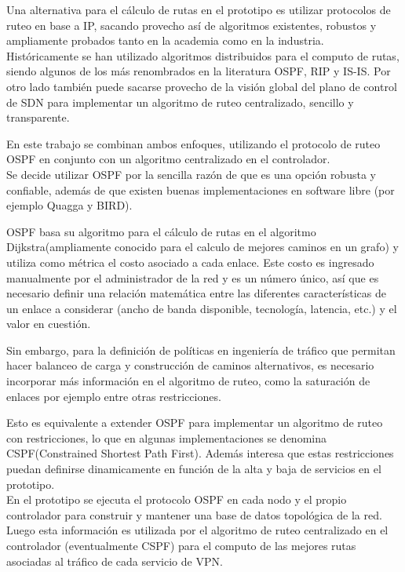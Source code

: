Una alternativa para el c\'alculo de rutas en el prototipo es utilizar protocolos de ruteo en base a IP, sacando provecho as\'i de algoritmos existentes, robustos y ampliamente probados tanto en la academia como en la industria.\\

Hist\'oricamente se han utilizado algoritmos distribuidos para el computo de rutas, siendo algunos de los m\'as renombrados en la literatura OSPF\cite{moy1998rfc}, RIP\cite{malkin1994rip} y IS-IS\cite{routingprotocol}. Por otro lado también puede sacarse provecho de la visi\'on global del plano de control de SDN para implementar un algoritmo de ruteo centralizado, sencillo y transparente.

En este trabajo se combinan ambos enfoques, utilizando el protocolo de ruteo OSPF en conjunto con un algoritmo centralizado en el controlador.\\

Se decide utilizar OSPF por la sencilla razón de que es una opción robusta y confiable, adem\'as de que existen buenas implementaciones en software libre (por ejemplo Quagga\cite{Quagga} y BIRD\cite{BIRD}).

OSPF basa su algoritmo para el c\'alculo de rutas en el algoritmo Dijkstra(ampliamente conocido para el calculo de mejores caminos en un grafo) y utiliza como m\'etrica el costo asociado a cada enlace. Este costo es ingresado manualmente por el administrador de la red y es un n\'umero \'unico, as\'i que es necesario definir una relaci\'on matem\'atica entre las diferentes caracter\'isticas de un enlace a considerar (ancho de banda disponible, tecnolog\'ia, latencia, etc.) y el valor en cuestión.

Sin embargo, para la definición de políticas en ingeniería de tr\'afico que permitan hacer balanceo de carga y construcción de caminos alternativos, es necesario incorporar m\'as informaci\'on en el algoritmo de ruteo, como la saturaci\'on de enlaces por ejemplo entre otras restricciones.

Esto es equivalente a extender OSPF para implementar un algoritmo de ruteo con restricciones, lo que en algunas implementaciones se denomina CSPF(Constrained Shortest Path First). Adem\'as interesa que estas restricciones puedan definirse dinamicamente en función de la alta y baja de servicios en el prototipo.\\

En el prototipo se ejecuta el protocolo OSPF en cada nodo y el propio controlador para construir y mantener una base de datos topol\'ogica de la red. Luego esta información es utilizada por el algoritmo de ruteo centralizado en el controlador (eventualmente CSPF) para el computo de las mejores rutas asociadas al tr\'afico de cada servicio de VPN.\\

